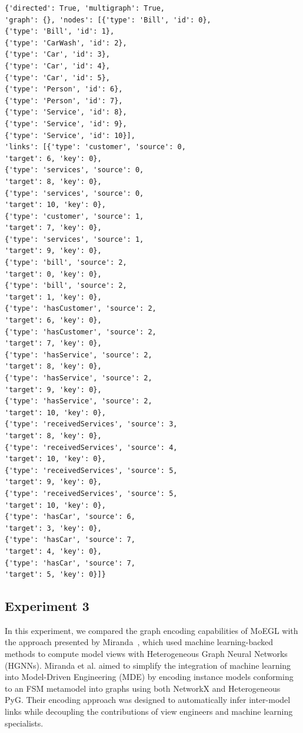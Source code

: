 \documentclass[journal,article,submit,moreauthors,technologies]{Definitions/mdpi}
\begin{document}
\begin{program_}[H]
\footnotesize
\begin{verbatim}
{'directed': True, 'multigraph': True,
'graph': {}, 'nodes': [{'type': 'Bill', 'id': 0},
{'type': 'Bill', 'id': 1},
{'type': 'CarWash', 'id': 2},
{'type': 'Car', 'id': 3},
{'type': 'Car', 'id': 4},
{'type': 'Car', 'id': 5},
{'type': 'Person', 'id': 6},
{'type': 'Person', 'id': 7},
{'type': 'Service', 'id': 8},
{'type': 'Service', 'id': 9},
{'type': 'Service', 'id': 10}],
'links': [{'type': 'customer', 'source': 0,
'target': 6, 'key': 0},
{'type': 'services', 'source': 0,
'target': 8, 'key': 0},
{'type': 'services', 'source': 0,
'target': 10, 'key': 0},
{'type': 'customer', 'source': 1,
'target': 7, 'key': 0},
{'type': 'services', 'source': 1,
'target': 9, 'key': 0},
{'type': 'bill', 'source': 2,
'target': 0, 'key': 0},
{'type': 'bill', 'source': 2,
'target': 1, 'key': 0},
{'type': 'hasCustomer', 'source': 2,
'target': 6, 'key': 0},
{'type': 'hasCustomer', 'source': 2,
'target': 7, 'key': 0},
{'type': 'hasService', 'source': 2,
'target': 8, 'key': 0},
{'type': 'hasService', 'source': 2,
'target': 9, 'key': 0},
{'type': 'hasService', 'source': 2,
'target': 10, 'key': 0},
{'type': 'receivedServices', 'source': 3,
'target': 8, 'key': 0},
{'type': 'receivedServices', 'source': 4,
'target': 10, 'key': 0},
{'type': 'receivedServices', 'source': 5,
'target': 9, 'key': 0},
{'type': 'receivedServices', 'source': 5,
'target': 10, 'key': 0},
{'type': 'hasCar', 'source': 6,
'target': 3, 'key': 0},
{'type': 'hasCar', 'source': 7,
'target': 4, 'key': 0},
{'type': 'hasCar', 'source': 7,
'target': 5, 'key': 0}]}
\end{verbatim}
\caption{The graph data of Carwash instance model in~\cite{rahimi2023towards}.}
\label{Listing:NetworkXRahimi}
\end{program_}

\subsection{Experiment 3}
In this experiment, we compared the graph encoding capabilities of MoEGL with the approach presented by Miranda~\cite{miranda2024towards}, which used machine learning-backed methods to compute model views with Heterogeneous Graph Neural Networks (HGNNs). Miranda et al. aimed to simplify the integration of machine learning into Model-Driven Engineering (MDE) by encoding instance models conforming to an FSM metamodel into graphs using both NetworkX and Heterogeneous PyG. Their encoding approach was designed to automatically infer inter-model links while decoupling the contributions of view engineers and machine learning specialists.
\end{document}
